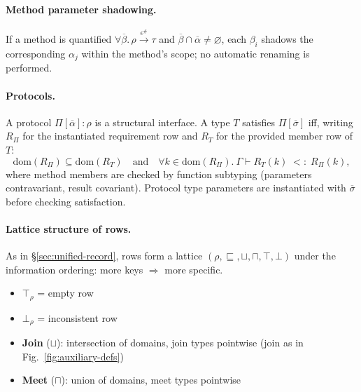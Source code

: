 \paragraph{Method parameter shadowing.}
If a method is quantified $\forall\overline{\beta}.\,\rho \xrightarrow{\epsilon^\#} \tau$ and $\overline{\beta} \cap \overline{\alpha} \neq \varnothing$, each $\beta_i$ shadows the corresponding $\alpha_j$ within the method’s scope; no automatic renaming is performed.

\paragraph{Protocols.}
A protocol $\Pi[\overline{\alpha}]: \rho$ is a structural interface.
A type $T$ satisfies $\Pi[\overline{\sigma}]$ iff, writing $R_\Pi$ for the instantiated requirement row and $R_T$ for the provided member row of $T$:
\[
\mathrm{dom}(R_\Pi) \subseteq \mathrm{dom}(R_T)
\quad\text{and}\quad
\forall k \in \mathrm{dom}(R_\Pi).\ \Gamma \vdash R_T(k) \;<:\; R_\Pi(k),
\]
where method members are checked by function subtyping (parameters contravariant, result covariant). Protocol type parameters are instantiated with $\overline{\sigma}$ before checking satisfaction.

\paragraph{Lattice structure of rows.}
As in \S\ref{sec:unified-record}, rows form a lattice $(\mathcal{\rho}, \sqsubseteq, \sqcup, \sqcap, \top, \bot)$ under the information ordering: more keys $\Rightarrow$ more specific.
\begin{itemize}
  \item $\top_\rho$ = empty row
  \item $\bot_\rho$ = inconsistent row
  \item \textbf{Join} ($\sqcup$): intersection of domains, join types pointwise (join as in Fig.~\ref{fig:auxiliary-defs})
  \item \textbf{Meet} ($\sqcap$): union of domains, meet types pointwise
\end{itemize}

